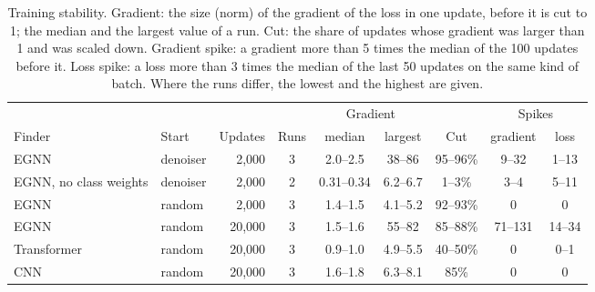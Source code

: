 \begin{table}[t]
\centering
\caption{Training stability. Gradient: the size (norm) of the gradient of the loss in one update, before it is cut to 1; the median and the largest value of a run. Cut: the share of updates whose gradient was larger than 1 and was scaled down. Gradient spike: a gradient more than 5 times the median of the 100 updates before it. Loss spike: a loss more than 3 times the median of the last 50 updates on the same kind of batch. Where the runs differ, the lowest and the highest are given.}
\label{tab:stability}
\footnotesize\setlength{\tabcolsep}{4pt}
\begin{tabularx}{\linewidth}{@{}>{\raggedright\arraybackslash}Xlrcccccc@{}}
\toprule
 & & & & \multicolumn{2}{c}{Gradient} & & \multicolumn{2}{c}{Spikes} \\
\cmidrule(lr){5-6}\cmidrule(l){8-9}
Finder & Start & Updates & Runs & median & largest & Cut & gradient & loss \\
\midrule
EGNN & denoiser & 2,000 & 3 & 2.0--2.5 & 38--86 & 95--96\% & 9--32 & 1--13 \\
EGNN, no class weights & denoiser & 2,000 & 2 & 0.31--0.34 & 6.2--6.7 & 1--3\% & 3--4 & 5--11 \\
EGNN & random & 2,000 & 3 & 1.4--1.5 & 4.1--5.2 & 92--93\% & 0 & 0 \\
\addlinespace
EGNN & random & 20,000 & 3 & 1.5--1.6 & 55--82 & 85--88\% & 71--131 & 14--34 \\
Transformer & random & 20,000 & 3 & 0.9--1.0 & 4.9--5.5 & 40--50\% & 0 & 0--1 \\
CNN & random & 20,000 & 3 & 1.6--1.8 & 6.3--8.1 & 85\% & 0 & 0 \\
\bottomrule
\end{tabularx}
\end{table}
